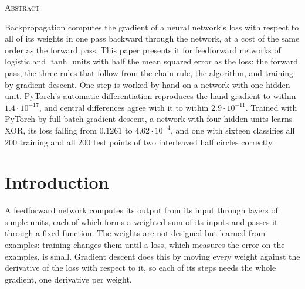 \documentclass[11pt,a4paper]{amsart}
\numberwithin{equation}{section}
\theoremstyle{plain}
\theoremstyle{definition}
\theoremstyle{remark}
\begin{document}
\begin{center}\scshape Abstract\end{center}
\noindent
Backpropagation computes the gradient of a neural network's loss with
respect to all of its weights in one pass backward through the network,
at a cost of the same order as the forward pass. This paper presents it
for feedforward networks of logistic and $\tanh$ units with half the
mean squared error as the loss: the forward pass, the three rules that
follow from the chain rule, the algorithm, and training by gradient
descent. One step is worked by hand on a network with one hidden unit.
PyTorch's automatic differentiation reproduces the hand gradient to
within ${1.4 \cdot 10^{-17}}$, and central differences agree with it to
within ${2.9 \cdot 10^{-11}}$. Trained with PyTorch by full-batch gradient
descent, a network with four hidden units learns XOR, its loss falling
from $0.1261$ to ${4.62 \cdot 10^{-4}}$, and one with sixteen classifies
all $200$ training and all $200$ test points of two interleaved half
circles correctly.

\bigskip
\setcounter{tocdepth}{1}
\tableofcontents

\section{Introduction}\label{sec:intro}

A feedforward network computes its output from its input through layers
of simple units, each of which forms a weighted sum of its inputs and
passes it through a fixed function. The weights are not designed but
learned from examples: training changes them until a loss, which
measures the error on the examples, is small. Gradient descent does this
by moving every weight against the derivative of the loss with respect
to it, so each of its steps needs the whole gradient, one derivative per
weight.
\end{document}
